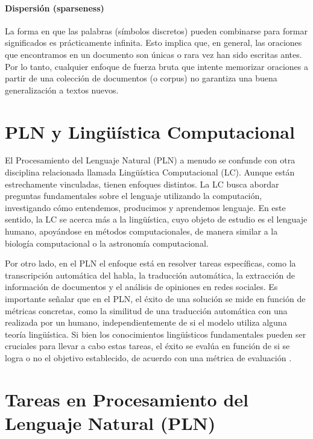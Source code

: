 \paragraph{Dispersión (sparseness)}

La forma en que las palabras (símbolos discretos) pueden combinarse para formar significados es prácticamente infinita. Esto implica que, en general, las oraciones que encontramos en un documento son únicas o rara vez han sido escritas antes. Por lo tanto, cualquier enfoque de fuerza bruta que intente memorizar oraciones a partir de una colección de documentos (o corpus) no garantiza una buena generalización a textos nuevos.






\section{PLN y Lingüística Computacional}

El Procesamiento del Lenguaje Natural (PLN) a menudo se confunde con otra disciplina relacionada llamada Lingüística Computacional (LC). Aunque están estrechamente vinculadas, tienen enfoques distintos. La LC busca abordar preguntas fundamentales sobre el lenguaje utilizando la computación, investigando cómo entendemos, producimos y aprendemos lenguaje. En este sentido, la LC se acerca más a la lingüística, cuyo objeto de estudio es el lenguaje humano, apoyándose en métodos computacionales, de manera similar a la biología computacional o la astronomía computacional.

Por otro lado, en el PLN el enfoque está en resolver tareas específicas, como la transcripción automática del habla, la traducción automática, la extracción de información de documentos y el análisis de opiniones en redes sociales. Es importante señalar que en el PLN, el éxito de una solución se mide en función de métricas concretas, como la similitud de una traducción automática con una realizada por un humano, independientemente de si el modelo utiliza alguna teoría lingüística. Si bien los conocimientos lingüísticos fundamentales pueden ser cruciales para llevar a cabo estas tareas, el éxito se evalúa en función de si se logra o no el objetivo establecido, de acuerdo con una métrica de evaluación \cite{jacobbook}.

\section{Tareas en Procesamiento del Lenguaje Natural (PLN)}

